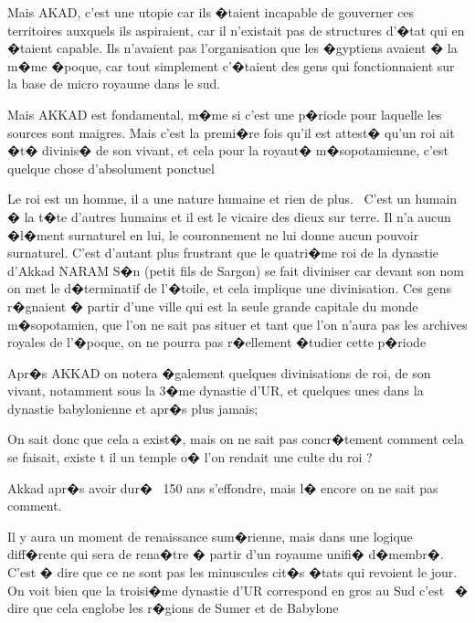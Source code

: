 \documentclass{article}
\begin{document}
Mais AKAD, c'est une utopie car ils �taient incapable de gouverner ces territoires auxquels ils aspiraient, car il n'existait pas de structures d'�tat qui en �taient capable. Ils n'avaient pas l'organisation que les �gyptiens avaient � la m�me �poque, car tout simplement c'�taient des gens qui fonctionnaient sur la base de micro royaume dans le sud.

Mais AKKAD est fondamental, m�me si c'est une p�riode pour laquelle les sources sont maigres. Mais c'est la premi�re fois qu'il est attest� qu'un roi ait �t� divinis� de son vivant, et cela pour la royaut� m�sopotamienne, c'est quelque chose d'absolument ponctuel


\bigskip


\bigskip


\bigskip

Le roi est un homme, il a une nature humaine et rien de plus. \ C'est un humain � la t�te d'autres humains et il est le vicaire des dieux sur terre. Il n'a aucun �l�ment surnaturel en lui, le couronnement ne lui donne aucun pouvoir surnaturel. C'est d'autant plus frustrant que le quatri�me roi de la dynastie d'Akkad NARAM S�n (petit fils de Sargon) se fait diviniser car devant son nom on met le d�terminatif de l'�toile, et cela implique une divinisation. Ces gens r�gnaient � partir d'une ville qui est la seule grande capitale du monde m�sopotamien, que l'on ne sait pas situer et tant que l'on n'aura pas les archives royales de l'�poque, on ne pourra pas r�ellement �tudier cette p�riode

Apr�s AKKAD on notera �galement quelques divinisations de roi, de son vivant, notamment sous la 3�me dynastie d'UR, et quelques unes dans la dynastie babylonienne et apr�s plus jamais;

On sait donc que cela a exist�, mais on ne sait pas concr�tement comment cela se faisait, existe t il un temple o� l'on rendait une culte du roi ?

Akkad apr�s avoir dur� \ 150 ans s'effondre, mais l� encore on ne sait pas comment.


\bigskip

Il y aura un moment de renaissance sum�rienne, mais dans une logique diff�rente qui sera de rena�tre � partir d'un royaume unifi� d�membr�. C'est � dire que ce ne sont pas les minuscules cit�s �tats qui revoient le jour. On voit bien que la troisi�me dynastie d'UR correspond en gros au Sud c'est \ � dire que cela englobe les r�gions de Sumer et de Babylone


\bigskip
\end{document}
